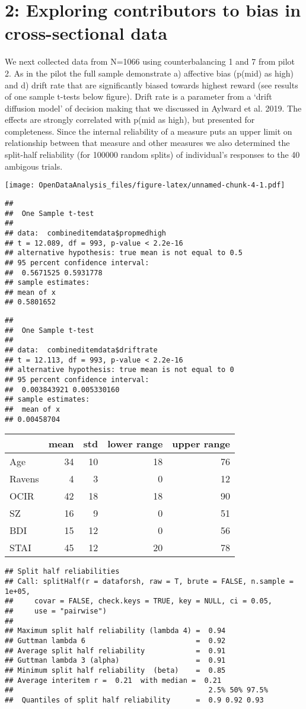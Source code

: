 \documentclass[]{article}
\begin{document}
\section{2: Exploring contributors to bias in cross-sectional
data}\label{exploring-contributors-to-bias-in-cross-sectional-data}

We next collected data from N=1066 using counterbalancing 1 and 7 from
pilot 2. As in the pilot the full sample demonstrate a) affective bias
(p(mid) as high) and d) drift rate that are significantly biased towards
highest reward (see results of one sample t-tests below figure). Drift
rate is a parameter from a `drift diffusion model' of decision making
that we discussed in Aylward et al. 2019. The effects are strongly
correlated with p(mid as high), but presented for completeness. Since
the internal reliability of a measure puts an upper limit on
relationship between that measure and other measures we also determined
the split-half reliability (for 100000 random splits) of individual's
responses to the 40 ambigous trials.

\texttt{[image: OpenDataAnalysis\_files/figure-latex/unnamed-chunk-4-1.pdf]}

\begin{verbatim}
## 
##  One Sample t-test
## 
## data:  combineditemdata$propmedhigh
## t = 12.089, df = 993, p-value < 2.2e-16
## alternative hypothesis: true mean is not equal to 0.5
## 95 percent confidence interval:
##  0.5671525 0.5931778
## sample estimates:
## mean of x 
## 0.5801652
\end{verbatim}

\begin{verbatim}
## 
##  One Sample t-test
## 
## data:  combineditemdata$driftrate
## t = 12.113, df = 993, p-value < 2.2e-16
## alternative hypothesis: true mean is not equal to 0
## 95 percent confidence interval:
##  0.003843921 0.005330160
## sample estimates:
##  mean of x 
## 0.00458704
\end{verbatim}

\begin{longtable}[]{@{}lrrrr@{}}
\toprule
& mean & std & lower range & upper range\tabularnewline
\midrule
\endhead
Age & 34 & 10 & 18 & 76\tabularnewline
Ravens & 4 & 3 & 0 & 12\tabularnewline
OCIR & 42 & 18 & 18 & 90\tabularnewline
SZ & 16 & 9 & 0 & 51\tabularnewline
BDI & 15 & 12 & 0 & 56\tabularnewline
STAI & 45 & 12 & 20 & 78\tabularnewline
\bottomrule
\end{longtable}

\begin{verbatim}
## Split half reliabilities  
## Call: splitHalf(r = dataforsh, raw = T, brute = FALSE, n.sample = 1e+05, 
##     covar = FALSE, check.keys = TRUE, key = NULL, ci = 0.05, 
##     use = "pairwise")
## 
## Maximum split half reliability (lambda 4) =  0.94
## Guttman lambda 6                          =  0.92
## Average split half reliability            =  0.91
## Guttman lambda 3 (alpha)                  =  0.91
## Minimum split half reliability  (beta)    =  0.85
## Average interitem r =  0.21  with median =  0.21
##                                              2.5% 50% 97.5%
##  Quantiles of split half reliability      =  0.9 0.92 0.93
\end{verbatim}
\end{document}
